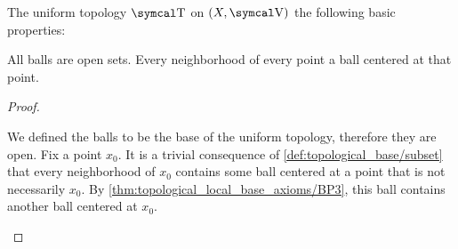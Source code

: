 \begin{proposition}\label{thm:uniform_topology_properties}
  The uniform topology \( \CT \) on \( (X, \CV) \) the following basic properties:
  \begin{defenum}
     All balls are open sets.
     Every neighborhood of every point a ball centered at that point.
  \end{defenum}
\end{proposition}
\begin{proof}\mbox{}
  \begin{description}
     We defined the balls to be the base of the uniform topology, therefore they are open.
     Fix a point \( x_0 \). It is a trivial consequence of \cref{def:topological_base/subset} that every neighborhood of \( x_0 \) contains some ball centered at a point that is not necessarily \( x_0 \). By \cref{thm:topological_local_base_axioms/BP3}, this ball contains another ball centered at \( x_0 \).
  \end{description}
\end{proof}

